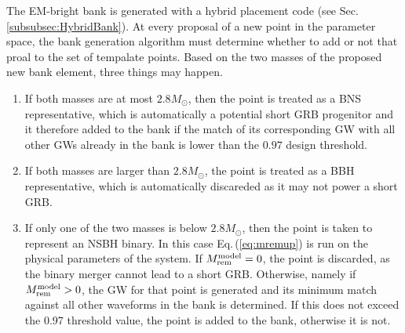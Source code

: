 \documentclass[binding=0.6cm, LaM]{sapthesis}
\begin{document}
      The EM-bright bank is generated with a hybrid placement code (see Sec.\,\ref{subsubsec:HybridBank}).  At every proposal of a new point in the parameter space, the bank generation algorithm must determine whether to add or not that proal to the set of tempalate points.  Based on the two masses of the proposed new bank element, three things may happen. 
      \begin{enumerate}
        \item If both masses are at most $2.8M_\odot$, then the point is treated as a BNS representative, which is automatically a potential short GRB progenitor and it therefore added to the bank if the match of its corresponding GW with all other GWs already in the bank is lower than the $0.97$ design threshold.
        \item If both masses are larger than $2.8M_\odot$, the point is treated as a BBH representative, which is automatically discareded as it may not power a short GRB.
        \item If only one of the two masses is below $2.8M_\odot$, then the point is taken to represent an NSBH binary. In this case Eq.\,(\ref{eq:mremup}) is run on the physical parameters of the system.  If $M_{\rm rem}^{\rm model}=0$, the point is discarded, as the binary merger cannot lead to a short GRB.  Otherwise, namely if $M_{\rm rem}^{\rm model}>0$, the GW for that point is generated and its minimum match against all other waveforms in the bank is determined.  If this does not exceed the 0.97 threshold value, the point is added to the bank, otherwise it is not.
        \end{enumerate}
\end{document}
